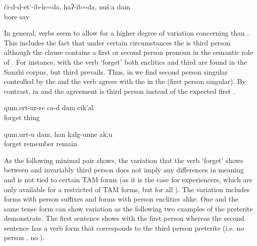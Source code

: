 \begin{exe}
	\ex	\label{ex:You (pl.) bored me, I said}
	\gll	či-d-d-et'-ib-le=da,	haʔ-ib=da,	nušːa	dam\\
		bore	say		\\
	\glt	{}
\end{exe}


In general,  verbs seem to allow for a higher degree of variation concerning  than . This includes the fact that under certain circumstances the  is third person although the clause contains a first or second person  pronoun in the semantic role of . For instance, with the verb `forget' both  enclitics and third  are found in the Sanzhi corpus, but third  prevails. Thus, in  we find second person singular controlled by the  and  the verb agrees with the  in the  (first person singular). By contrast, in  and  the agreement is third person instead of the expected first . 
%

\begin{exe}
	\ex	\label{ex:I forgot everythingA}
	\gll	qum.ert-ur-re	ca-d	dam	cik'al\\
		forget			thing\\
	\glt	{}
	
		\ex	\label{ex:I forget (it), I do not remember it.}
	\gll	qum.urt-u dam, han kalg-unne akːu\\
		forget		remember remain. \\
	\glt	{}
	
\end{exe}

As the following minimal pair shows, the variation that the verb `forget' shows between  and invariably third person does not imply any differences in meaning and is not tied to certain TAM forms (as it is the case for  experiencers, which are only available for a restricted  of TAM forms, but for all ). The variation includes forms with person suffixes and forms with person enclitics alike. One and the same tense form can show variation as the following two examples of the preterite demonstrate. The first sentence  shows  with the first person  whereas the second sentence  has a verb form that corresponds to the third person preterite (i.e. no person , no ). 


